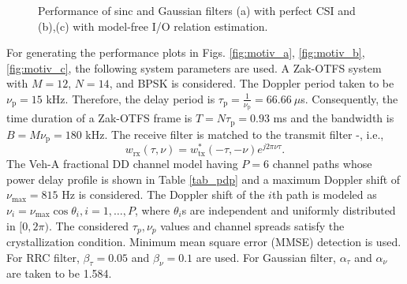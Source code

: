 \begin{figure*}
\hspace{2mm}
\hfill  {}
\caption{Performance of sinc and Gaussian filters (a) with perfect CSI and (b),(c) with model-free I/O relation estimation.}
\vspace{-4mm}
\label{fig:motiv}
\end{figure*}

For generating the performance plots in Figs. \ref{fig:motiv_a}, \ref{fig:motiv_b}, \ref{fig:motiv_c}, the following system parameters are used. A Zak-OTFS system with $M=12$, $N=14$, and BPSK is considered. The Doppler period taken to be $\nu_{\mathrm p}=15$ kHz. Therefore, the delay period is $\tau_{\mathrm p}=\frac{1}{\nu_{\mathrm p}}=66.66\ \mu$s. Consequently, the time duration of a Zak-OTFS frame is $T=N\tau_{\mathrm p}=0.93$ ms and the bandwidth is $B=M\nu_{\mathrm p}=180$ kHz. The receive filter is matched to the transmit filter \cite{zak_otfs6}-\cite{zak_otfs11}, i.e., 
\begin{equation}
w_{\mathrm{rx}}(\tau,\nu)=w^{*}_{\mathrm{tx}}(-\tau,-\nu) e^{j2\pi \nu\tau}.
\label{mat_filtering}
\end{equation}
The Veh-A fractional DD channel model \cite{ITU_VehA} having $P=6$ channel paths whose power delay profile is shown in Table \ref{tab_pdp} and a maximum Doppler shift of $\nu_{\max}=815$ Hz is considered. The Doppler shift of the $i$th path is modeled as $\nu_{i}=\nu_{\mathrm{max}}\cos\theta_{i},i=1,\ldots,P$, where $\theta_{i}$s are independent and uniformly distributed in $[0,2\pi)$. The considered $\tau_p,\nu_p$ values and channel spreads satisfy the crystallization condition. Minimum mean square error (MMSE) detection is used. For RRC filter, $\beta_\tau=0.05$ and $\beta_\nu=0.1$ are used. For Gaussian filter, $\alpha_\tau$ and $\alpha_\nu$ are taken to be 1.584. 

